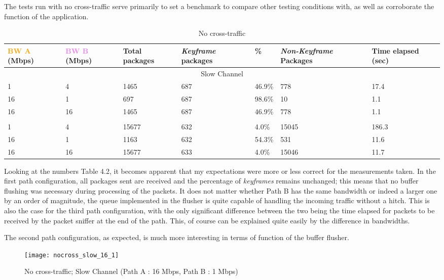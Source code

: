 The tests run with no cross-traffic serve primarily to set a benchmark to compare other testing conditions with, as well as corroborate the function of the application. 

\begin{table}[htbp]
\caption{No cross-traffic}
\break
\setlength{\arrayrulewidth}{1mm}
\setlength{\tabcolsep}{12pt}
\renewcommand{\arraystretch}{1.5}
 {
\begin{tabular}{ |p{1.375cm}|p{1.375cm}|p{1.5cm}|p{1.5cm}|p{1cm}|p{1.75cm}|p{1.75cm}| }
\hline
\textcolor{orange}{BW A} (Mbps)&\textcolor{violet}{BW B} (Mbps)& Total packages & \textit{Keyframe} packages & \% & \textit{Non-Keyframe} Packages & Time elapsed (sec) \\
\hline
\multicolumn{7}{|c|}{Slow Channel} \\
\hline
1&4&1465&687&46.9\%&778&17.4\\
16&1&697&687&98.6\%&10&1.1\\
16&16&1465&687&46.9\%&778&1.1\\
\hline
\rowcolor{white}\multicolumn{7}{|c|}{Medium Channel} \\
\hline
1&4&15677&632&4.0\%&15045&186.3\\
16&1&1163&632&54.3\%&531&11.6\\
16&16&15677&633&4.0\%&15046&11.7\\
\hline
\end{tabular}
}
\end{table}

Looking at the numbers Table 4.2, it becomes apparent that my expectations were more or less correct for the measurements taken. In the first path configuration, all packages sent are received and the percentage of \textit{keyframes} remains unchanged; this means that no buffer flushing was necessary during processing of the packets. It does not matter whether Path B has the same bandwidth or indeed a larger one by an order of magnitude, the queue implemented in the flusher is quite capable of handling the incoming traffic without a hitch. This is also the case for the third path configuration, with the only significant difference between the two being the time elapsed for packets to be received by the packet sniffer at the end of the path. This, of course can be explained quite easily by the difference in bandwidths.

The second path configuration, as expected, is much more interesting in terms of function of the buffer flusher.

\begin{figure}[!ht]
\caption{No cross-traffic; Slow Channel (Path A : 16 Mbps, Path B : 1 Mbps)}
\centering
\texttt{[image: nocross\_slow\_16\_1]}
\end{figure}

